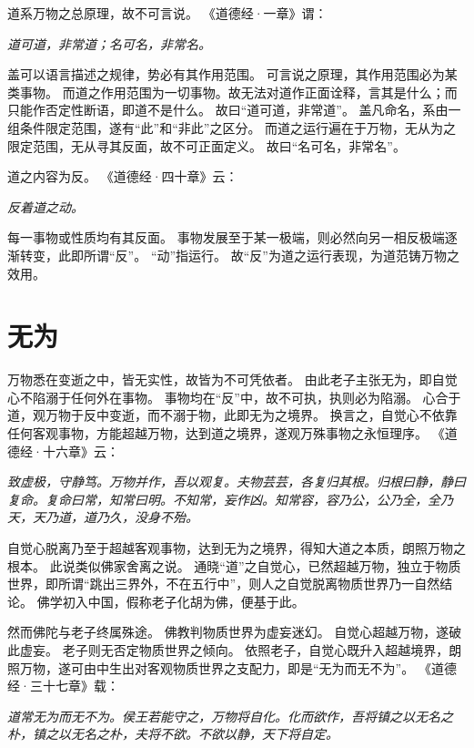 \documentclass[11pt]{article}
\begin{document}
\newline

道系万物之总原理，故不可言说。
《道德经·一章》谓：

\textit{道可道，非常道；名可名，非常名。}

盖可以语言描述之规律，势必有其作用范围。
可言说之原理，其作用范围必为某类事物。
而道之作用范围为一切事物。故无法对道作正面诠释，言其是什么；而只能作否定性断语，即道不是什么。
故曰“道可道，非常道”。
盖凡命名，系由一组条件限定范围，遂有“此”和“非此”之区分。
而道之运行遍在于万物，无从为之限定范围，无从寻其反面，故不可正面定义。
故曰“名可名，非常名”。

\newline

道之内容为反。
《道德经·四十章》云：

\textit{反着道之动。}

每一事物或性质均有其反面。
事物发展至于某一极端，则必然向另一相反极端逐渐转变，此即所谓“反”。
“动”指运行。
故“反”为道之运行表现，为道范铸万物之效用。
  
\section{无为}
万物悉在变逝之中，皆无实性，故皆为不可凭依者。
由此老子主张无为，即自觉心不陷溺于任何外在事物。
事物均在“反”中，故不可执，执则必为陷溺。
心合于道，观万物于反中变逝，而不溺于物，此即无为之境界。
换言之，自觉心不依靠任何客观事物，方能超越万物，达到道之境界，遂观万殊事物之永恒理序。
《道德经·十六章》云：

\textit{致虚极，守静笃。万物并作，吾以观复。夫物芸芸，各复归其根。归根曰静，静曰复命。复命曰常，知常曰明。不知常，妄作凶。知常容，容乃公，公乃全，全乃天，天乃道，道乃久，没身不殆。}

\newline

自觉心脱离乃至于超越客观事物，达到无为之境界，得知大道之本质，朗照万物之根本。
此说类似佛家舍离之说。
通晓“道”之自觉心，已然超越万物，独立于物质世界，即所谓“跳出三界外，不在五行中”，则人之自觉脱离物质世界乃一自然结论。
佛学初入中国，假称老子化胡为佛，便基于此。

\newline

然而佛陀与老子终属殊途。
佛教判物质世界为虚妄迷幻。
自觉心超越万物，遂破此虚妄。
老子则无否定物质世界之倾向。
依照老子，自觉心既升入超越境界，朗照万物，遂可由中生出对客观物质世界之支配力，即是“无为而无不为”。
《道德经·三十七章》载：

\textit{道常无为而无不为。侯王若能守之，万物将自化。化而欲作，吾将镇之以无名之朴，镇之以无名之朴，夫将不欲。不欲以静，天下将自定。} 
\end{document}
